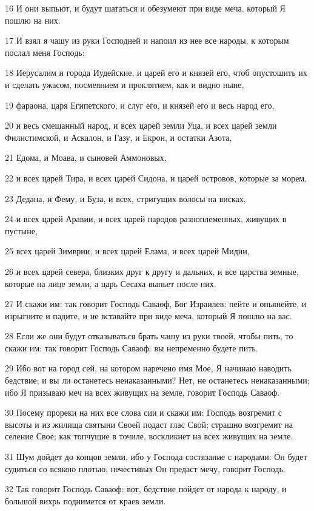 \par 16 И они выпьют, и будут шататься и обезумеют при виде меча, который Я пошлю на них.
\par 17 И взял я чашу из руки Господней и напоил из нее все народы, к которым послал меня Господь:
\par 18 Иерусалим и города Иудейские, и царей его и князей его, чтоб опустошить их и сделать ужасом, посмеянием и проклятием, как и видно ныне,
\par 19 фараона, царя Египетского, и слуг его, и князей его и весь народ его,
\par 20 и весь смешанный народ, и всех царей земли Уца, и всех царей земли Филистимской, и Аскалон, и Газу, и Екрон, и остатки Азота,
\par 21 Едома, и Моава, и сыновей Аммоновых,
\par 22 и всех царей Тира, и всех царей Сидона, и царей островов, которые за морем,
\par 23 Дедана, и Фему, и Буза, и всех, стригущих волосы на висках,
\par 24 и всех царей Аравии, и всех царей народов разноплеменных, живущих в пустыне,
\par 25 всех царей Зимврии, и всех царей Елама, и всех царей Мидии,
\par 26 и всех царей севера, близких друг к другу и дальних, и все царства земные, которые на лице земли, а царь Сесаха выпьет после них.
\par 27 И скажи им: так говорит Господь Саваоф, Бог Израилев: пейте и опьянейте, и изрыгните и падите, и не вставайте при виде меча, который Я пошлю на вас.
\par 28 Если же они будут отказываться брать чашу из руки твоей, чтобы пить, то скажи им: так говорит Господь Саваоф: вы непременно будете пить.
\par 29 Ибо вот на город сей, на котором наречено имя Мое, Я начинаю наводить бедствие; и вы ли останетесь ненаказанными? Нет, не останетесь ненаказанными; ибо Я призываю меч на всех живущих на земле, говорит Господь Саваоф.
\par 30 Посему прореки на них все слова сии и скажи им: Господь возгремит с высоты и из жилища святыни Своей подаст глас Свой; страшно возгремит на селение Свое; как топчущие в точиле, воскликнет на всех живущих на земле.
\par 31 Шум дойдет до концов земли, ибо у Господа состязание с народами: Он будет судиться со всякою плотью, нечестивых Он предаст мечу, говорит Господь.
\par 32 Так говорит Господь Саваоф: вот, бедствие пойдет от народа к народу, и большой вихрь поднимется от краев земли.
